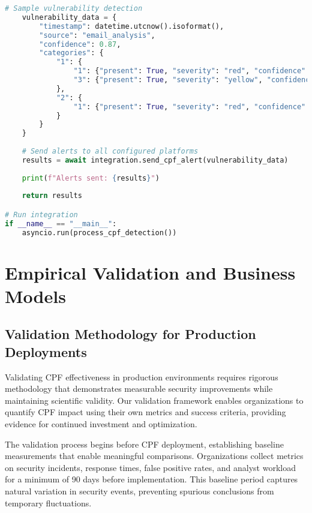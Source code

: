\documentclass[11pt,a4paper]{article}
\begin{document}
\begin{lstlisting}[language=Python, caption=SIEM Integration Module]
    # Sample vulnerability detection
    vulnerability_data = {
        "timestamp": datetime.utcnow().isoformat(),
        "source": "email_analysis",
        "confidence": 0.87,
        "categories": {
            "1": {
                "1": {"present": True, "severity": "red", "confidence": 0.92},
                "3": {"present": True, "severity": "yellow", "confidence": 0.78}
            },
            "2": {
                "1": {"present": True, "severity": "red", "confidence": 0.89}
            }
        }
    }
    
    # Send alerts to all configured platforms
    results = await integration.send_cpf_alert(vulnerability_data)
    
    print(f"Alerts sent: {results}")
    
    return results

# Run integration
if __name__ == "__main__":
    asyncio.run(process_cpf_detection())
\end{lstlisting}

\section{Empirical Validation and Business Models}

\subsection{Validation Methodology for Production Deployments}

Validating CPF effectiveness in production environments requires rigorous methodology that demonstrates measurable security improvements while maintaining scientific validity. Our validation framework enables organizations to quantify CPF impact using their own metrics and success criteria, providing evidence for continued investment and optimization.

The validation process begins before CPF deployment, establishing baseline measurements that enable meaningful comparisons. Organizations collect metrics on security incidents, response times, false positive rates, and analyst workload for a minimum of 90 days before implementation. This baseline period captures natural variation in security events, preventing spurious conclusions from temporary fluctuations.
\end{document}
